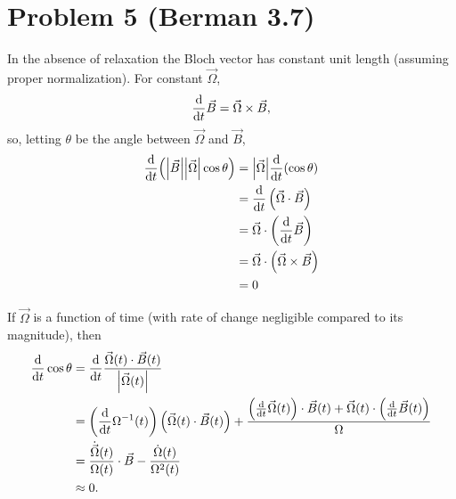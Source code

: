 \documentclass[12pt]{article}
\begin{document}
\section*{Problem 5 (Berman 3.7)}
In the absence of relaxation the Bloch vector has constant unit length (assuming proper normalization). For constant $\vec{\Omega}$,
\[ \dv{t}\vec{B} = \vec{\Omega}\times\vec{B}, \]
so, letting $\theta$ be the angle between $\vec\Omega$ and $\vec{B}$,
\begin{align*}
    \dv{t}(\abs{\vec{B}}\abs{\vec\Omega}\cos\theta) &= \abs{\vec\Omega}\dv{t}(\cos\theta) \\
    &= \dv{t}\left(\vec\Omega\cdot\vec{B}\right) \\
    &= \vec\Omega\cdot\left(\dv{t}\vec{B}\right) \\
    &= \vec\Omega\cdot\left(\vec{\Omega}\times\vec{B}\right) \\
    &= 0
\end{align*}

If $\vec\Omega$ is a function of time (with rate of change negligible compared to its magnitude), then
\begin{align*}
    \dv{t}\cos\theta &= \dv{t}\frac{\vec\Omega(t)\cdot\vec{B}(t)}{\abs{\vec\Omega(t)}} \\
    &= \left(\dv{t}\Omega^{-1}(t)\right)\left(\vec\Omega(t)\cdot\vec{B}(t)\right) + \frac{\left(\dv{t}\vec\Omega(t)\right)\cdot\vec{B}(t) + \vec\Omega(t)\cdot\left(\dv{t}\vec{B}(t)\right)}{\Omega} \\
    &= \frac{\dot{\vec{\Omega}}(t)}{\Omega(t)}\cdot\vec{B} -\frac{\dot\Omega(t)}{\Omega^2(t)} \\
    &\approx 0.
\end{align*}


\end{document}
